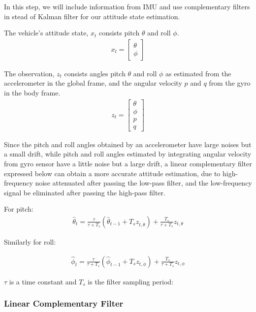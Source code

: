 \documentclass[letterpaper]{article}
\begin{document}
In this step, we will include information from IMU and use complementary filters in stead of Kalman filter for our attitude state estimation.

The vehicle's attitude state, $x_t$ consists pitch $\theta$ and roll $\phi$.
\begin{align*}
  x_t = \left[ \begin{array}{c}\theta\\\phi \end{array} \right]
\end{align*}

The observation, $z_t$ consists angles pitch $\theta$ and roll $\phi$ as estimated from the accelerometer in the global frame, and the angular velocity $p$ and $q$ from the gyro in the body frame.
\begin{align*}
  z_t = \left[ \begin{array}{c}\theta\\\phi\\p\\q \end{array} \right]
\end{align*}

Since the pitch and roll angles obtained by an accelerometer have large noises but a small drift, while pitch and roll angles estimated by integrating angular velocity from gyro sensor have a little noise but a large drift, a linear complementary filter expressed below can obtain a more accurate attitude estimation, due to high-frequency noise attenuated after passing the low-pass filter, and the low-frequency signal be eliminated after passing the high-pass filter.

For pitch: 
\begin{align*}
  \hat{\theta}_t = \frac{\tau}{\tau + T_s} \left( \hat{\theta}_{t-1} + T_s z_{t,\dot{\theta}} \right) + \frac{T_s}{\tau + T_s} z_{t,\theta}
\end{align*}

Similarly for roll: 

\begin{align*}
  \hat{\phi}_t = \frac{\tau}{\tau + T_s} \left( \hat{\phi}_{t-1} + T_s z_{t,\dot{\phi}} \right) + \frac{T_s}{\tau + T_s} z_{t,\phi}
\end{align*}

$\tau$ is a time constant and $T_s$ is the filter sampling period:


\subsubsection{Linear Complementary Filter}
\end{document}
